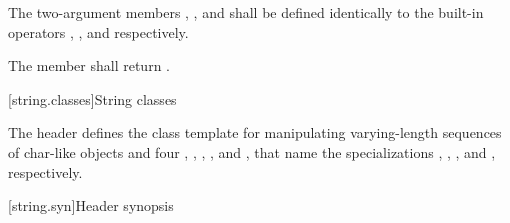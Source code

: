 \pnum
The two-argument members
,
,
and
shall be defined identically
to the built-in operators
\tcode{=},
\tcode{==},
and
\tcode{<}
respectively.

\pnum
The member
shall return
.

[string.classes]{String classes}

\pnum
The header  defines the
 class template for manipulating
varying-length sequences of char-like objects and four
, ,
,
,
and , that name
the specializations
,
,
,
and
, respectively.

[string.syn]{Header  synopsis}
%

